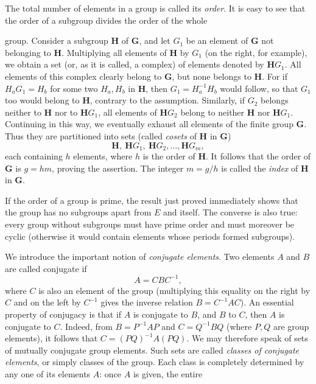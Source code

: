 The total number of elements in a group is called its \emph{order}. It is easy to see that the order of a subgroup divides the order of the whole

group. Consider a subgroup $\boldsymbol{H}$ of $\boldsymbol{G}$, and let $G_1$ be an element of $\boldsymbol{G}$ not belonging to $\boldsymbol{H}$. Multiplying all elements of $\boldsymbol{H}$ by $G_1$ (on the right, for example), we obtain a set (or, as it is called, a complex) of elements denoted by $\boldsymbol{H}G_1$. All elements of this complex clearly belong to $\boldsymbol{G}$, but none belongs to $\boldsymbol{H}$. For if $H_aG_1=H_b$ for some two $H_a,H_b$ in $\boldsymbol{H}$, then $G_1=H_a^{-1}H_b$ would follow, so that $G_1$ too would belong to $\boldsymbol{H}$, contrary to the assumption. Similarly, if $G_2$ belongs neither to $\boldsymbol{H}$ nor to $\boldsymbol{H}G_1$, all elements of $\boldsymbol{H}G_2$ belong to neither $\boldsymbol{H}$ nor $\boldsymbol{H}G_1$. Continuing in this way, we eventually exhaust all elements of the finite group $\boldsymbol{G}$. Thus they are partitioned into sets (called \emph{cosets} of $\boldsymbol{H}$ in $\boldsymbol{G}$)
\[
\boldsymbol{H},\ \boldsymbol{H}G_1,\ \boldsymbol{H}G_2,\ldots,\boldsymbol{H}G_m,
\]
each containing $h$ elements, where $h$ is the order of $\boldsymbol{H}$. It follows that the order of $\boldsymbol{G}$ is $g=hm$, proving the assertion. The integer $m=g/h$ is called the \emph{index} of $\boldsymbol{H}$ in $\boldsymbol{G}$.

If the order of a group is prime, the result just proved immediately shows that the group has no subgroups apart from $E$ and itself. The converse is also true: every group without subgroups must have prime order and must moreover be cyclic (otherwise it would contain elements whose periods formed subgroups).

We introduce the important notion of \emph{conjugate elements}. Two elements $A$ and $B$ are called conjugate if
\[
A=CBC^{-1},
\]
where $C$ is also an element of the group (multiplying this equality on the right by $C$ and on the left by $C^{-1}$ gives the inverse relation $B=C^{-1}AC$). An essential property of conjugacy is that if $A$ is conjugate to $B$, and $B$ to $C$, then $A$ is conjugate to $C$. Indeed, from $B=P^{-1}AP$ and $C=Q^{-1}BQ$ (where $P,Q$ are group elements), it follows that $C=(PQ)^{-1}A(PQ)$. We may therefore speak of sets of mutually conjugate group elements. Such sets are called \emph{classes of conjugate elements}, or simply classes of the group. Each class is completely determined by any one of its elements $A$: once $A$ is given, the entire

